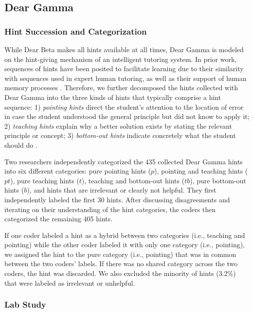 \subsection{Dear Gamma}

\subsubsection{Hint Succession and Categorization}

While Dear Beta makes all hints available at all times, Dear Gamma is modeled on the hint-giving mechanism of an intelligent tutoring system. In prior work, sequences of hints have been posited to facilitate learning due to their similarity with sequences used in expert human tutoring, as well as their support of human memory processes \cite{sottilare2014design}. Therefore, we further decomposed the hints collected with Dear Gamma into the three kinds of hints that typically comprise a hint sequence: 1) \textit{pointing hints} direct the student's attention to the location of error in case the student understood the general principle but did not know to apply it; 2) \textit{teaching hints} explain why a better solution exists by stating the relevant principle or concept; 3) \textit{bottom-out hints} indicate concretely what the student should do \cite{andes}. 

Two researchers independently categorized the 435 collected Dear Gamma hints into six different categories: pure pointing hints ($p$), pointing and teaching hints ($pt$), pure teaching hints ($t$), teaching and bottom-out hints ($tb$), pure bottom-out hints ($b$), and hints that are irrelevant or clearly not helpful. They first independently labeled the first 30 hints. After discussing disagreements and iterating on their understanding of the hint categories, the coders then categorized the remaining 405 hints. 

If one coder labeled a hint as a hybrid between two categories (i.e., teaching and pointing) while the other coder labeled it with only one category (i.e., pointing), we assigned the hint to the pure category (i.e., pointing) that was in common between the two coders' labels. If there was no shared category across the two coders, the hint was discarded. We also excluded the minority of hints (3.2\%) that were labeled as irrelevant or unhelpful.

\subsubsection{Lab Study}

